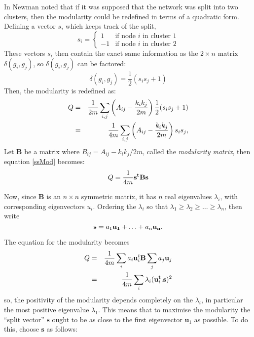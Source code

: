 In \citep{Newman2006a,Newman2006b} Newman noted that if it was supposed that the network was 
split into two clusters, then the modularity could be redefined in terms of a
quadratic form.  Defining a vector $s$, which keeps track of the
split,
\begin{equation}
s_i = \left\{ \begin{array}{ll} 1 & \mbox{if node $i$ in cluster 1}
  \\ -1 & \mbox{if node $i$ in cluster 2}\end{array} \right.
\end{equation}
These vectors $s_i$ then contain the exact same information as the $2\times n$ matrix $\delta (g_i,g_j)$, so $\delta (g_i,g_j) $ can be factored:
\begin{equation}
\delta (g_i,g_j) = \frac{1}{2} \left( s_i s_j + 1 \right)
\end{equation}
Then, the modularity is redefined as:
\begin{eqnarray} \label{ssMod}
Q & = & \frac{1}{2m}\sum_{i,j} \left(A_{ij} - \frac{k_ik_j}{2m}\right)\frac{1}{2}(s_is_j + 1)\cr
& = &\frac{1}{4m}\sum_{i,j} \left(A_{ij} - \frac{k_ik_j}{2m}\right)s_is_j,
\end{eqnarray}
Let $\mathbf{B}$ be a matrix where 
$B_{ij} = A_{ij} - k_ik_j/2m$, called the \emph{modularity matrix}, 
then equation \ref{ssMod} becomes:
\begin{equation}
Q = \frac{1}{4m}{\bf s^tBs}
\end{equation}

Now, since $\mathbf{B}$ is an $n\times n$ symmetric matrix, it has $n$ real eigenvalues $\lambda_i$, with corresponding
eigenvectors $u_i$.  Ordering the $\lambda_i$ so that $
\lambda_1 \geq \lambda_2 \geq \ldots \geq \lambda_n$, then write 
\begin{equation}
{\bf s} = a_1{\bf u_1}+ \ldots + a_n{\bf u_n}.
\end{equation}


The equation for the modularity becomes
\begin{eqnarray}
Q & = & \frac{1}{4m} \sum_{i} a_i{\bf u}_i^t{\bf B}\sum_ja_j{\bf u}_j\cr
& = & \frac{1}{4m} \sum_i \lambda_i ({\bf u}_i^{\bf t}.{\bf s})^2
\end{eqnarray}
so, the positivity of the modularity depends completely on the $\lambda_i$, in 
particular the most positive eigenvalue $\lambda_1$.  This means that to 
maximise the modularity the ``split vector'' $\mathbf{s}$ ought to be 
as close to the first eigenvector $\mathbf{u}_1$ as possible. To do this, 
choose $\mathbf{s}$ as follows:

